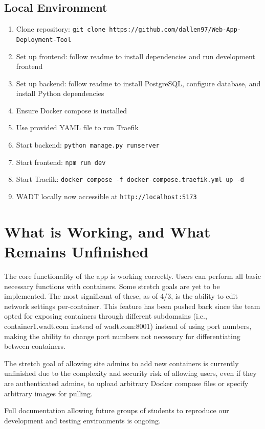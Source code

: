 \documentclass[12pt,titlepage]{article}
\begin{document}
\subsection{Local Environment}
\begin{enumerate}
	\item Clone repository: \texttt{git clone https://github.com/dallen97/Web-App-Deployment-Tool}
	\item  Set up frontend: follow readme to install dependencies and run development frontend
	\item Set up backend: follow readme to install PostgreSQL, configure database, and install Python dependencies
	\item Ensure Docker compose is installed
	\item Use provided YAML file to run Traefik
	\item Start backend: \texttt{python manage.py runserver}
	\item Start frontend: \texttt{npm run dev}
	\item Start Traefik: \texttt{docker compose -f docker-compose.traefik.yml up -d}
	\item WADT locally now accessible at \texttt{http://localhost:5173}
\end{enumerate}

\section{What is Working, and What Remains Unfinished}
The core functionality of the app is working correctly. Users can perform all basic necessary functions with containers.
Some stretch goals are yet to be implemented. The most significant of these, as of 4/3, is the ability to edit network
settings per-container. This feature has been pushed back since the team opted for exposing containers through different subdomains
(i.e., container1.wadt.com instead of wadt.com:8001) instead of using port numbers, making the ability to change port numbers not
necessary for differentiating between containers.

The stretch goal of allowing site admins to add new containers is currently unfinished due to the complexity and security risk of
allowing users, even if they are authenticated admins, to upload arbitrary Docker compose files or specify arbitrary images for pulling.

Full documentation allowing future groups of students to reproduce our development and testing environments is ongoing.
\end{document}
